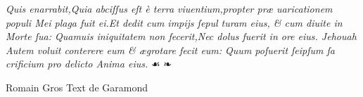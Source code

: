 \documentclass{article}
\begin{document}
{\begin{multicols}{2}
	\justifying
	\noindent
	\textit{Quis enarrabit,Quia abciſſus eſt \`e terra viuentium,propter pr\ae{} \linebreak
	uaricationem populi {M}ei plaga fuit ei.Et dedit cum impijs ſepul\linebreak
	turam eius, \& cum diuite in Morte ſua: Quamuis iniquitatem\linebreak
	non fecerit,{\normalfont \textit N}ec dolus fuerit in ore eius. Jehouah Autem voluit\linebreak
	conterere eum \& \ae{}grotare fecit eum: {Quum} poſuerit ſeipſum ſa\linebreak
	crificium pro delicto Anima eius.}  {\normalfont \fontsize{9}{7}\selectfont \quad ☙ ❧}
\end{multicols}
\vspace{-3\baselineskip}
\begin{multicols}{2}
	\tiny
	\centering
	Romain Gros Text de Garamond\\
	\vspace{0.5\baselineskip}
	\small
	\justifying
	\noindent {}


\end{multicols}}
\end{document}
